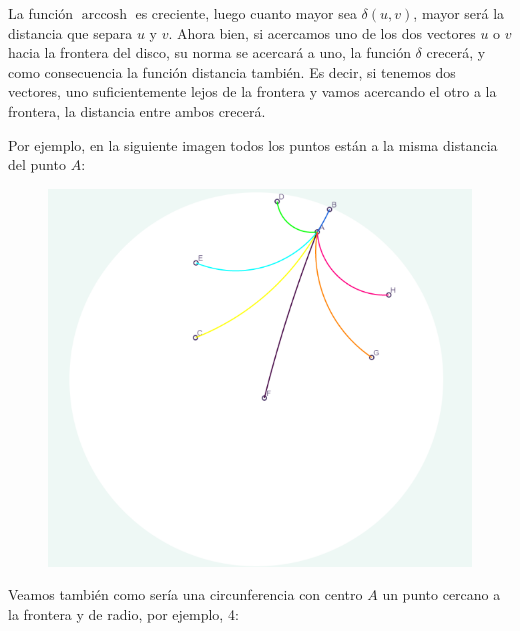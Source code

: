 \documentclass{article}
\theoremstyle{plain}
\theoremstyle{definition}
\theoremstyle{remark}
\begin{document}
La función $\operatorname{arccosh}$ es creciente, luego cuanto mayor
sea $\delta(u,v)$, mayor será la distancia que separa $u$ y $v$. Ahora
bien, si acercamos uno de los dos vectores $u$ o $v$ hacia la frontera
del disco, su norma se acercará a uno, la función $\delta$ crecerá, y
como consecuencia la función distancia también. Es decir, si tenemos
dos vectores, uno suficientemente lejos de la frontera y vamos
acercando el otro a la frontera, la distancia entre ambos crecerá.

Por ejemplo, en la siguiente imagen todos los puntos están a la misma
distancia del punto $A$:

\begin{figure}[h]
\includegraphics{Distancias.png}
\end{figure}

Veamos también como sería una circunferencia con centro $A$ un punto
cercano a la frontera y de radio, por ejemplo, 4:
\end{document}
